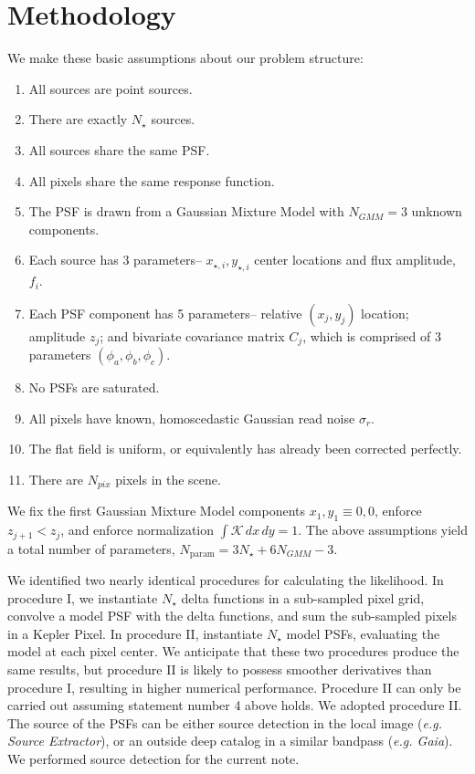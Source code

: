 \documentclass{rnaastex}
\begin{document}
\section{Methodology}
We make these basic assumptions about our problem structure:

\begin{enumerate}
  \item All sources are point sources.
  \item There are exactly $N_{\star}$ sources.
  \item All sources share the same PSF.
  \item All pixels share the same response function.
  \item The PSF is drawn from a Gaussian Mixture Model with $N_{GMM} = 3$ unknown components.
  \item Each source has 3 parameters-- $x_{\star,i}, y_{\star,i}$ center locations and flux amplitude, $f_i$.
  \item Each PSF component has 5 parameters-- relative $(x_j, y_j)$ location; amplitude $z_j$; and bivariate covariance matrix $C_j$, which is comprised of 3 parameters $(\phi_a, \phi_b, \phi_c)$.
  \item No PSFs are saturated.
  \item All pixels have known, homoscedastic Gaussian read noise $\sigma_{r}$.
  \item The flat field is uniform, or equivalently has already been corrected perfectly.
  \item There are $N_{pix}$ pixels in the scene.
\end{enumerate}

We fix the first Gaussian Mixture Model components $x_1,y_1 \equiv 0, 0$, enforce $z_{j+1} < z_{j}$, and enforce normalization $\int \mathcal{K} \,dx\,dy = 1$. The above assumptions yield a total number of parameters, $N_{\mathrm{param}} = 3 N_\star + 6 N_{GMM} - 3$.

We identified two nearly identical procedures for calculating the likelihood.  In procedure I, we instantiate $N_\star$ delta functions in a sub-sampled pixel grid, convolve a model PSF with the delta functions, and sum the sub-sampled pixels in a Kepler Pixel.  In procedure II, instantiate $N_\star$ model PSFs, evaluating the model at each pixel center.  We anticipate that these two procedures produce the same results, but procedure II is likely to possess smoother derivatives than procedure I, resulting in higher numerical performance.  Procedure II can only be carried out assuming statement number 4 above holds.  We adopted procedure II.  The source of the PSFs can be either source detection in the local image (\emph{e.g. Source Extractor}), or an outside deep catalog in a similar bandpass (\emph{e.g. Gaia}).  We performed source detection for the current note.
\end{document}
